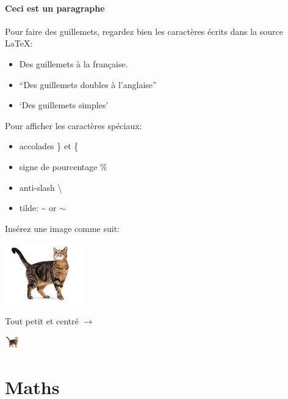 \documentclass[paper=a4, fontsize=11pt]{article}
\begin{document}
\paragraph{Ceci est un paragraphe}
Pour faire des guillemets, regardez bien les caractères écrits dans la source \LaTeX: 
\begin{itemize}
\item \og Des guillemets à la française\fg{}.
\item ``Des guillemets doubles à l'anglaise''
\item `Des guillemets simples'
\end{itemize}

\vspace{0.5cm} 

Pour afficher les caractères spéciaux:
\begin{itemize}
\item accolades \} et \{
\item signe de pourcentage \%
\item anti-slash \textbackslash
\item tilde: \textasciitilde{} or $\sim$ 
\end{itemize}

\vspace{0.5cm} %


Insérez une image comme suit:

\includegraphics[width=100pt]{myimage.jpg} %

Tout petit et centré $\rightarrow$

\begin{center}
\includegraphics[width=20pt]{myimage.jpg} %
\end{center}

\section{Maths}
\end{document}
